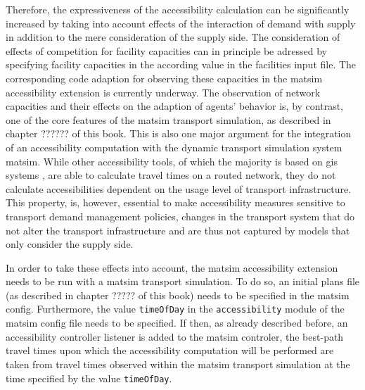 Therefore, the expressiveness of the accessibility calculation can be significantly increased by taking into account 
effects of the interaction of demand with supply in addition to the mere consideration of the supply side. The consideration
of effects of competition for facility capacities can in principle be adressed by specifying facility capacities in the 
according value in the facilities input file. The corresponding code adaption for observing these capacities in the \gls{matsim} 
accessibility extension is currently underway. The observation of network capacities and 
their effects on the adaption of agents' behavior is, by contrast, one of the core features of the \gls{matsim} transport 
simulation, as described in chapter ?????? of this book. This is also one major argument for the integration of an 
accessibility computation with the dynamic transport simulation system \gls{matsim}. While other accessibility tools, of 
which the majority is based on \gls{gis} systems
\citep{BBSR20xxErreichbarkeitsmodell, CurtisEtAl2013AccessibilityPolicyInnovation, BuettnerEtAl2010Erreichbarkeitsatlas, LiuZhu2004AccessibilityAnalyst, GulhanEtAl2014PotentialAccessibilityMeasureDenizli}, are able to calculate travel times 
on a routed network, they do not calculate accessibilities dependent on the usage level of transport infrastructure. 
This property, is, however, essential to make accessibility measures sensitive to transport demand management policies, 
\ie changes in the transport system that do not alter the transport infrastructure and are thus not captured by models 
that only consider the supply side.


In order to take these effects into account, the \gls{matsim} accessibility extension needs to be run with a \gls{matsim} 
transport simulation. To do so, an initial plans file (as described in chapter ????? of this book) needs to be specified 
in the \gls{matsim} config. Furthermore, the value \texttt{timeOfDay} in the \texttt{accessibility} module of the \gls{matsim}
config file needs to be specified. If then, as already described before, an accessibility controller listener is added to 
the \gls{matsim} controler, the best-path travel times upon which the accessibility computation will be performed are taken 
from travel times observed within the \gls{matsim} transport simulation at the time specified by the value \texttt{timeOfDay}.

